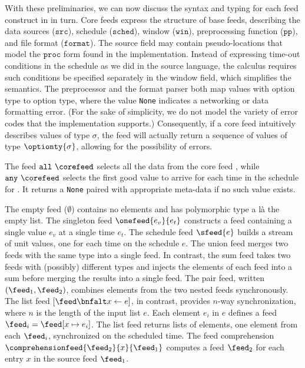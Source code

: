With these preliminaries, we can now discuss the syntax and typing for
each feed construct in  in turn. 
Core feeds express the structure of base feeds, describing
the data sources ($\mathtt{src}$), schedule ($\mathtt{sched}$), window
($\mathtt{win}$), preprocessing function ($\mathtt{pp}$), and file
format ($\mathtt{format}$).  The source field may contain
pseudo-locations that model the $\mathtt{proc}$ form found in the
implementation.  Instead of expressing time-out conditions in the
schedule as we did in the source language, the calculus requires such
conditions be specified separately in the window field, which simplifies
the semantics.  The preprocessor and the format parser both map values
with option type to option type, where the value \texttt{None}
indicates a networking or data formatting error. (For the sake of
simplicity, we do not model the variety of error codes that the
implementation supports.)  Consequently, if a core feed intuitively
describes values of type $\sigma$, the feed will actually return a
sequence of values of type $\optionty{\sigma}$, allowing for the
possibility of errors.  

The feed $\mathtt{all}\ \corefeed$ selects all the data from the core
feed \corefeed, while $\mathtt{any}\ \corefeed$ selects the first
good value to arrive for each time in the schedule for \corefeed{}.
It returns a \texttt{None} paired with appropriate meta-data if no
such value exists.   

The empty feed ($\emptyset$) contains no elements and has polymorphic
type a l\`a the empty list.  The singleton feed $\onefeed{e_v}{e_t}$
constructs a feed containing a single value $e_v$ at a single time
$e_t$.  The schedule feed $\sfeed{e}$ builds a stream of
unit values, one for each time on the schedule $e$.
The union feed merges two feeds with the same type
into a single feed.  In contrast, the sum feed takes two feeds
with (possibly) different types and injects the elements of each feed
into a sum before merging the results into a single feed.  
The pair feed, written $(\feed_1, \feed_2)$, combines elements from
the two nested feeds synchronously.  
The list feed $[\feed \bnfalt x \leftarrow e ]$, in contrast, provides
$n$-way synchronization, where $n$ is the length of the input list
$e$.  Each element $e_i$ in $e$ defines a feed $\feed_i = \feed[x \mapsto e_i]$.
The list feed returns lists of elements, one element from each
$\feed_i$, synchronized on the scheduled time.  The feed comprehension
$\comprehensionfeed{\feed_2}{x}{\feed_1}$ computes a feed $\feed_2$
for each entry $x$ in the source feed $\feed_1$.





